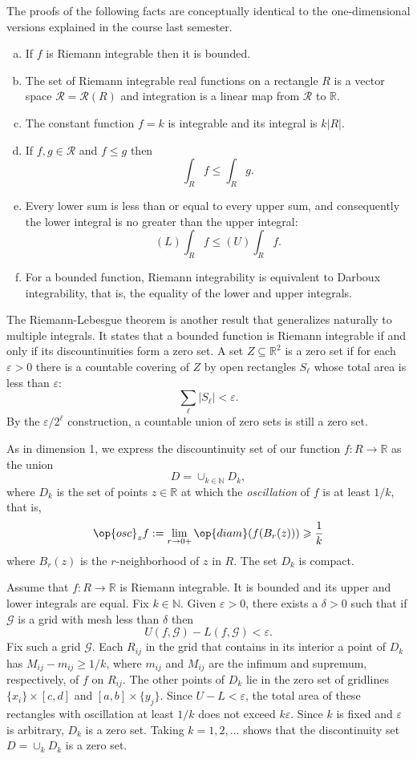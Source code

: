 \documentclass[11pt]{article}
\begin{document}
The proofs of the following facts are conceptually identical to the one-dimensional versions explained in the course last semester.
\begin{enumerate}[(a)]
  \item If $f$ is Riemann integrable then it is bounded.
  \item The set of Riemann integrable real functions on a rectangle $R$ is a vector space $\mathcal{R} = \mathcal{R}(R)$ and integration is a linear map from $\mathcal{R}$ to $\mathbb{R}$.
  \item The constant function $f = k$ is integrable and its integral is $k |R|$.
  \item If $f, g \in \mathcal{R}$ and $f \leqslant g$ then 
    \[
      \int_R f \leqslant \int_R g.
    \]
  \item Every lower sum is less than or equal to every upper sum, and consequently the lower integral is no greater than the upper integral:
    \[
      (L) \int_R f \leqslant (U) \int_R f.
    \]
  \item For a bounded function, Riemann integrability is equivalent to Darboux integrability, that is, the equality of the lower and upper integrals.
\end{enumerate}

The Riemann-Lebesgue theorem is another result that generalizes naturally to multiple integrals.  It states that a bounded function is Riemann integrable if and only if its discountinuities form a zero set.
A set $Z \subseteq \mathbb{R}^2$ is a \textsf{zero set} if for each $\varepsilon > 0$ there is a countable covering of $Z$ by open rectangles $S_\ell$ whose total area is less than $\varepsilon$:
\[
  \sum_\ell |S_\ell| < \varepsilon.
\]
By the $\varepsilon/2^\ell$ construction, a countable union of zero sets is still a zero set.

As in dimension 1, we express the discountinuity set of our function $f : R \to \mathbb{R}$ as the union
\[
  D = \cup_{k \in \mathbb{N}} D_k,
\]
where $D_k$ is the set of points $z \in \mathbb{R}$ at which the \textit{oscillation} of $f$ is at least $1/k$, that is,
\[
  \op{osc}_z f := \lim_{r \to 0+} \op{diam}(f(B_r(z))) \geqslant \frac1k
\]
where $B_r(z)$ is the $r$-neighborhood of $z$ in $R$.
The set $D_k$ is compact.

Assume that $f : R \to \mathbb{R}$ is Riemann integrable.
It is bounded and its upper and lower integrals are equal.
Fix $k \in \mathbb{N}$.
Given $\varepsilon > 0$, there exists a $\delta > 0$ such that if $\mathcal{G}$ is a grid with mesh less than $\delta$ then
\[
  U(f,\mathcal{G}) - L(f,\mathcal{G}) < \varepsilon.
\]
Fix such a grid $\mathcal{G}$.  Each $R_{ij}$ in the grid that contains in its interior a point of $D_k$ has $M_{ij} - m_{ij} \geqslant 1/k$, where $m_{ij}$ and $M_{ij}$ are the infimum and supremum, respectively, of $f$ on $R_{ij}$.  The other points of $D_k$ lie in the zero set of gridlines $\{ x_i \} \times [c,d]$ and $[a,b] \times \{ y_j \}$.  Since $U - L < \varepsilon$, the total area of these rectangles with oscillation at least $1/k$ does not exceed $k \varepsilon$.  Since $k$ is fixed and $\varepsilon$ is arbitrary, $D_k$ is a zero set.  Taking $k = 1, 2, \dots$ shows that the discontinuity set $D = \cup_k D_k$ is a zero set.
\end{document}

